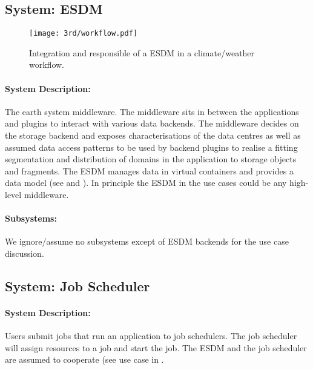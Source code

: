 \subsection{System: ESDM}
\label{System: ESDM}

\begin{figure}
	\centering
	\texttt{[image: 3rd/workflow.pdf]}
	\caption{Integration and responsible of a ESDM in a climate/weather workflow.}
	\label{fig:system esdm}
\end{figure}


\paragraph{System Description:}
The earth system middleware.
The middleware sits in between the applications and plugins to interact with various data backends.
The middleware decides on the storage backend and exposes characterisations of the data centres as well as assumed data access patterns to be used by backend plugins to realise a fitting segmentation and distribution of domains in the application to storage objects and fragments.
The ESDM manages data in virtual containers and provides a data model (see  and ).
In principle the ESDM in the use cases could be any high-level middleware.


\paragraph{Subsystems:}
We ignore/assume no subsystems except of ESDM backends for the use case discussion.







\subsection{System: Job Scheduler}
\label{System: Job Scheduler}

\paragraph{System Description:}
Users submit jobs that run an application to  job schedulers.
The job scheduler will assign resources to a job and start the job.
The ESDM and the job scheduler are assumed to cooperate (see use case in .

